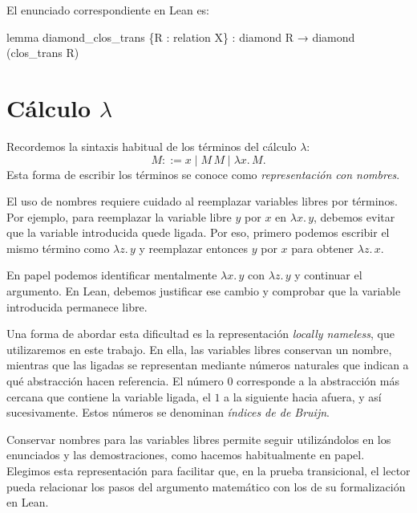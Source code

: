 \documentclass[
  spanish,
  letterpaper,
  DIV=11,
  numbers=noendperiod]{scrreprt}
\newenvironment{Shaded}{\begin{snugshade}}{\end{snugshade}}
\newcommand{\KeywordTok}[1]{\textcolor[rgb]{0.00,0.23,0.31}{\textbf{#1}}}
\newcommand{\NormalTok}[1]{\textcolor[rgb]{0.00,0.23,0.31}{#1}}
\renewcommand{\NormalTok}[1]{\textcolor[HTML]{000000}{#1}}
\renewcommand{\KeywordTok}[1]{\textcolor[HTML]{0000FF}{#1}}
\theoremstyle{remark}
\begin{document}
El enunciado correspondiente en Lean es:

\begin{Shaded}
\begin{Highlighting}[]
\KeywordTok{lemma}\NormalTok{ diamond\_clos\_trans \{R : relation X\} :}
\NormalTok{    diamond R →}
\NormalTok{    diamond (clos\_trans R)}
\end{Highlighting}
\end{Shaded}


\chapter{\texorpdfstring{Cálculo
\(\lambda\)}{Cálculo \textbackslash lambda}}\label{cuxe1lculo-lambda}

Recordemos la sintaxis habitual de los términos del cálculo \(\lambda\):
\[
M ::= x \mid M\,M \mid \lambda x.\,M.
\] Esta forma de escribir los términos se conoce como
\emph{representación con nombres}.

El uso de nombres requiere cuidado al reemplazar variables libres por
términos. Por ejemplo, para reemplazar la variable libre \(y\) por \(x\)
en \(\lambda x.\,y\), debemos evitar que la variable introducida quede
ligada. Por eso, primero podemos escribir el mismo término como
\(\lambda z.\,y\) y reemplazar entonces \(y\) por \(x\) para obtener
\(\lambda z.\,x\).

En papel podemos identificar mentalmente \(\lambda x.\,y\) con
\(\lambda z.\,y\) y continuar el argumento. En Lean, debemos justificar
ese cambio y comprobar que la variable introducida permanece libre.

Una forma de abordar esta dificultad es la representación \emph{locally
nameless}, que utilizaremos en este trabajo. En ella, las variables
libres conservan un nombre, mientras que las ligadas se representan
mediante números naturales que indican a qué abstracción hacen
referencia. El número \(0\) corresponde a la abstracción más cercana que
contiene la variable ligada, el \(1\) a la siguiente hacia afuera, y así
sucesivamente. Estos números se denominan \emph{índices de de Bruijn}.

Conservar nombres para las variables libres permite seguir utilizándolos
en los enunciados y las demostraciones, como hacemos habitualmente en
papel. Elegimos esta representación para facilitar que, en la prueba
transicional, el lector pueda relacionar los pasos del argumento
matemático con los de su formalización en Lean.
\end{document}
